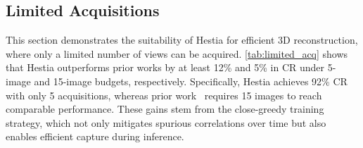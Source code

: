 
\subsection{Limited Acquisitions}

This section demonstrates the suitability of Hestia for efficient 3D reconstruction, where only a limited number of views can be acquired. 
\cref{tab:limited_acq} shows that Hestia outperforms prior works by at least 12\% and 5\% in CR under 5-image and 15-image budgets, respectively. 
Specifically, Hestia achieves 92\% CR with only 5 acquisitions, whereas prior work~\cite{chen2024gennbv} requires 15 images to reach comparable performance. 
These gains stem from the close-greedy training strategy, which not only mitigates spurious correlations over time but also enables efficient capture during inference.


